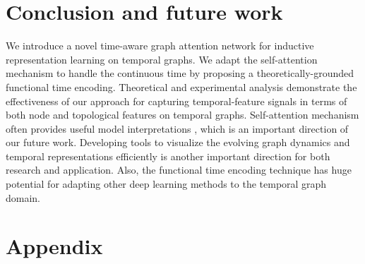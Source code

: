 \documentclass{article} %
\begin{document}
\section{Conclusion and future work}
\label{sec:conclusion}
We introduce a novel time-aware graph attention network for inductive representation learning on temporal graphs. We adapt the self-attention mechanism to handle the continuous time by proposing a theoretically-grounded functional time encoding. Theoretical and experimental analysis demonstrate the effectiveness of our approach for capturing temporal-feature signals in terms of both node and topological features on temporal graphs. Self-attention mechanism often provides useful model interpretations \citep{vaswani2017attention}, which is an important direction of our future work. Developing tools to visualize the evolving graph dynamics and temporal representations efficiently is another important direction for both research and application. Also, the functional time encoding technique has huge potential for adapting other deep learning methods to the temporal graph domain. 

\newpage





\newpage
\appendix
\section{Appendix}
\label{sec:appendix}
\end{document}
